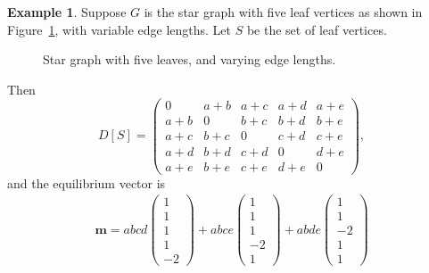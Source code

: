 \documentclass[12pt]{amsart}
\theoremstyle{definition}
\newtheorem{eg}[thm]{Example}
\newcommand{\boldm}{\mathbf{m}}
\begin{document}
\begin{eg}\label{eg:5-star}
Suppose $G$ is the star graph with five leaf vertices as shown in Figure~\ref{fig:star-5}, with variable edge lengths.
Let $S$ be the set of leaf vertices.
\begin{figure}[h]
	\centering
	\caption{Star graph with five leaves, and varying edge lengths.}
	\label{fig:star-5}
\end{figure}
Then 
\[
	D[S] = \begin{pmatrix}
	0 & a + b & a + c & a + d & a + e \\
	a + b & 0 & b + c & b + d & b + e \\
	a + c & b + c & 0 & c + d & c + e \\
	a + d & b + d & c + d & 0 & d + e\\
	a + e & b + e & c + e & d + e & 0
	\end{pmatrix} ,
\]
and the equilibrium vector is
\begin{multline}
	\boldm = 
	abcd \begin{pmatrix} 1 \\ 1 \\ 1 \\ 1 \\ -2 \end{pmatrix} 
	+ abce \begin{pmatrix} 1 \\ 1 \\ 1 \\ -2 \\ 1 \end{pmatrix} 
	+ abde \begin{pmatrix} 1 \\ 1 \\ -2 \\ 1 \\ 1 \end{pmatrix} 

\end{multline}
\end{eg}
\end{document}
